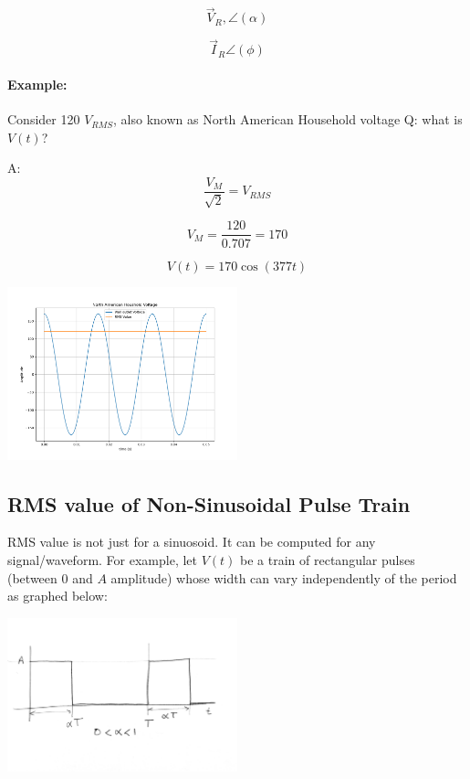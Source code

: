 
\[
\vec{V}_R, \angle(\alpha)
\]

\[
\vec{I}_R \angle(\phi)
\]


\paragraph{Example:}  Consider
120 $V_{RMS}$, also known as North American Household voltage
\vspace{0.25in}
\noindent Q: what is $V(t)$?
\vspace{0.25in}

\noindent A:
\[
\frac{V_M}{\sqrt{2}} = V_{RMS}
\]

\[
V_M = \frac{ 120 } {0.707} = 170
\]

\[
V(t) = 170 \cos(377t)
\]

\includegraphics[width=0.5\textwidth]{figsChapt03/FM67804.png}



\subsection{RMS value of Non-Sinusoidal Pulse Train}
RMS value is not just for a sinuosoid.  It can be computed for any signal/waveform.
For example, let $V(t)$ be a train of rectangular pulses (between 0 and $A$ amplitude)
whose width can vary
independently of the period   as graphed below:


\includegraphics[width=0.5\textwidth]{figsChapt03/HT21139.png}


